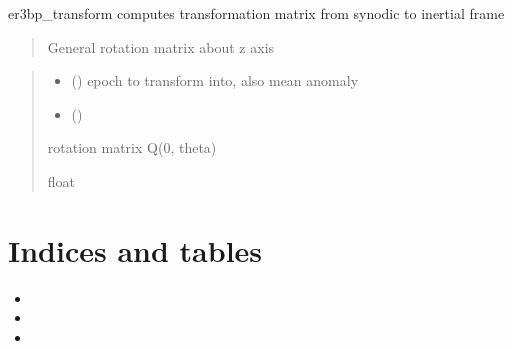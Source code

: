 \documentclass[letterpaper,10pt,english]{sphinxmanual}
\begin{document}

\begin{fulllineitems}
\label{\detokenize{models:pyraa.models.er3bp_transform}}
\pysigstartsignatures
{}
\pysigstopsignatures
\sphinxAtStartPar
er3bp\_transform \sphinxhyphen{} computes transformation matrix from synodic to inertial frame
\begin{quote}

\sphinxAtStartPar
General rotation matrix about z axis
\end{quote}
\begin{quote}\begin{description}
\begin{itemize}
\item {} 
\sphinxAtStartPar
{} () \sphinxhyphen{}\sphinxhyphen{} epoch to transform into, also mean anomaly

\item {} 
\sphinxAtStartPar
{} () \sphinxhyphen{}\sphinxhyphen{} 

\end{itemize}

\sphinxAtStartPar
{} \sphinxhyphen{}\sphinxhyphen{} rotation matrix Q(0, theta)

\sphinxAtStartPar
float

\end{description}\end{quote}

\end{fulllineitems}



\chapter{Indices and tables}
\label{\detokenize{index:indices-and-tables}}\begin{itemize}
\item {} 
\sphinxAtStartPar
{}

\item {} 
\sphinxAtStartPar
{}

\item {} 
\sphinxAtStartPar
{}

\end{itemize}
\end{document}
